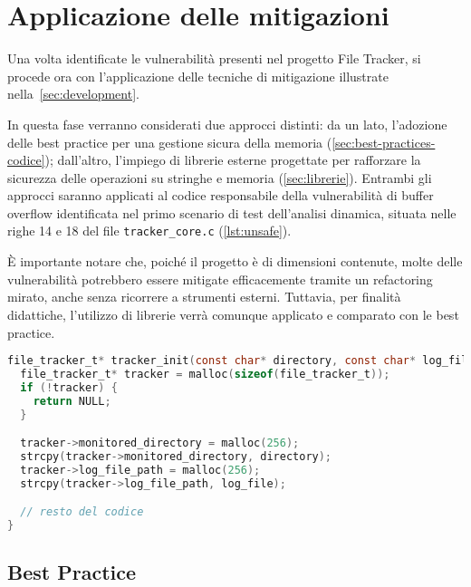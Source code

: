 \section{Applicazione delle mitigazioni}
\label{sec:mitigation_techniques}

Una volta identificate le vulnerabilità presenti nel progetto File Tracker, si
procede ora con l'applicazione delle tecniche di mitigazione illustrate nella~\autoref{sec:development}.

In questa fase verranno considerati due approcci distinti: da un lato, l'adozione
delle best practice per una gestione sicura della memoria (\autoref{sec:best-practices-codice});
dall'altro, l'impiego di librerie esterne progettate per rafforzare la sicurezza
delle operazioni su stringhe e memoria (\autoref{sec:librerie}). Entrambi gli approcci
saranno applicati al codice responsabile della vulnerabilità di buffer overflow identificata
nel primo scenario di test dell'analisi dinamica, situata nelle righe 14 e 18
del file \texttt{tracker\_core.c} (\autoref{lst:unsafe}).

È importante notare che, poiché il progetto è di dimensioni contenute, molte delle
vulnerabilità potrebbero essere mitigate efficacemente tramite un refactoring mirato,
anche senza ricorrere a strumenti esterni. Tuttavia, per finalità didattiche, l'utilizzo
di librerie verrà comunque applicato e comparato con le best practice.

\begin{lstlisting}[language=C, caption={Codice originale vulnerabile}, label={lst:unsafe}, style=changes_in_c]
file_tracker_t* tracker_init(const char* directory, const char* log_file) {
  file_tracker_t* tracker = malloc(sizeof(file_tracker_t));
  if (!tracker) {
    return NULL;
  }

  tracker->monitored_directory = malloc(256);
  strcpy(tracker->monitored_directory, directory);
  tracker->log_file_path = malloc(256);
  strcpy(tracker->log_file_path, log_file);

  // resto del codice
}
\end{lstlisting}

\subsection*{Best Practice}
\label{sec:best-practices-case-study}

